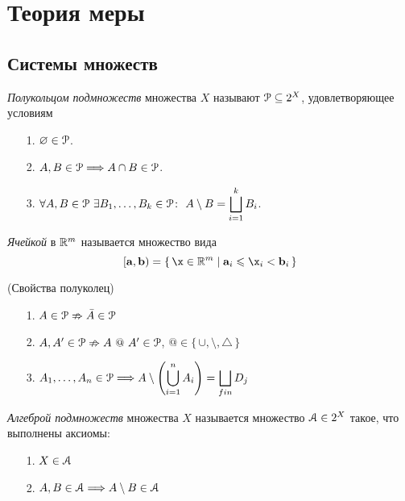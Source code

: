 \chapter{Теория меры}

\section{Системы множеств}

\begin{definition}
    \textit{Полукольцом подмножеств} множества $X$ называют $\mathcal{P} \subseteq 2^X$,
    удовлетворяющее условиям
    \begin{itemize}
        \item[1.] $\varnothing \in \mathcal{P}$.
        \item[2.] $A, B \in \mathcal{P} \Longrightarrow A \cap B \in \mathcal{P}$.
        \item[3.] $\displaystyle \forall A, B \in \mathcal{P}~ \exists B_1, \ldots,
        B_k \in \mathcal{P}\colon~ A \setminus B = \bigsqcup_{i = 1}^{k}{B_i}$.
    \end{itemize}
\end{definition}

\begin{definition}
    \textit{Ячейкой} в $\mathbb{R}^m$ называется множество вида
\[
    [\ela, \elb) = \{\, \x \in \Rm \mid \ela_i \leqslant \x_i < \elb_i \,\}
\]
\end{definition}

\begin{theorem}(Свойства полуколец)
    \begin{itemize}
        \item[1.] $A \in \mathcal{P} \nRightarrow \bar{A} \in \mathcal{P}$
        \item[2.] $A, A' \in \mathcal{P} \nRightarrow A~@~A' \in \mathcal{P}$, $@ \in
        \{\, \cup, \setminus, \triangle \,\}$
        \item[3.] $\displaystyle A_1, \ldots, A_n \in \mathcal{P} \Longrightarrow A \setminus
        \left(\bigcup_{i = 1}^{n}{A_i}\right) = \bigsqcup_{fin}{D_j}$
    \end{itemize}
\end{theorem}

\begin{definition}
    \textit{Алгеброй подмножеств} множества $X$ называется множество $\mathcal{A} \in
    2^X$ такое, что выполнены аксиомы:
    \begin{itemize}
        \item[1.] $X \in \mathcal{A}$
        \item[2.] $A, B \in \mathcal{A} \Longrightarrow A \setminus B \in \mathcal{A}$
    \end{itemize}
\end{definition}

